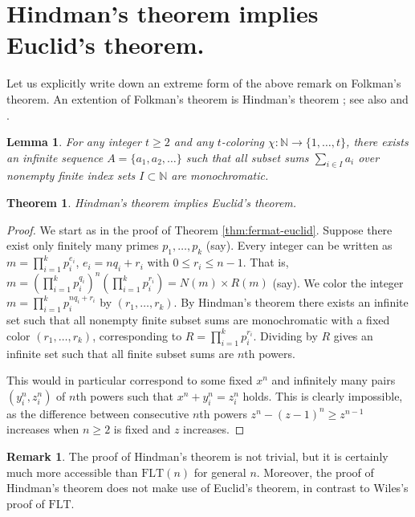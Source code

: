 \documentclass[12pt]{article}
\theoremstyle{theorem}
\newtheorem{theorem}{Theorem}
\newtheorem{lemma}{Lemma}
\theoremstyle{definition}
\newtheorem*{remark}{Remark}
\newcommand{\N}{\mathbb N}
\newcommand{\FLT}{\mathrm{FLT}}
\begin{document}
\section{Hindman's theorem implies Euclid's theorem.}
{\label{sec:Hindman}}
Let us explicitly write down an extreme form of the above remark on
Folkman's theorem.
An extention of Folkman's theorem is Hindman's theorem  
\cite{Hindman:1974}; see 
also \cite{Baumgartner:1974} and 
\cite[p. 85]{Graham-Rothschild-Spencer}. 
\begin{lemma}
For any integer $t\geq 2$ and any $t$-coloring 
$\chi:\N \rightarrow \{1, \ldots , t\}$, there exists an infinite sequence 
$A=\{a_1, a_2, \ldots \}$ such that all subset sums 
$\sum_{i \in I} a_i$ over nonempty 
finite index sets $I\subset \N$ are monochromatic.
\end{lemma}
\begin{theorem}{\label{thm:Hindman-implies-Euclid}}
Hindman's theorem implies Euclid's theorem.
\end{theorem}
\begin{proof}
We start as in the proof of Theorem {\ref{thm:fermat-euclid}}.
Suppose there exist only finitely many primes $p_1, \ldots, p_k$ (say).
Every integer
can be written as $m= \prod_{i=1}^k p_i^{e_i}$, 
$e_i=nq_i +r_i$ with \mbox{$0 \leq r_i \leq n-1$}. That is, 
$m= \left(\prod_{i=1}^k p_i^{q_i}\right)^n \left( \prod_{i=1}^k
  p_i^{r_i}\right) =N(m)\times R(m)$ (say).
We
color the integer $m= \prod_{i=1}^k p_i^{n q_i +r_i}$ by $(r_1, \ldots ,r_k)$. 
By Hindman's theorem there exists an infinite set such that
all nonempty finite subset sums are monochromatic with a fixed color
$(r_1, \ldots , r_k)$, corresponding to
$R=\prod_{i=1}^k p_i^{r_i}$.
 Dividing by $R$
gives an infinite set such that all finite subset sums
are $n$th powers.

This would
in particular correspond to some fixed $x^n$ and infinitely many 
pairs $(y_i^n,z_i^n)$ of $n$th powers such that $x^n+y_i^n=z_i^n$ holds.
This is clearly impossible, as the difference between
consecutive $n$th powers $z^n-(z-1)^n\geq z^{n-1}$ increases when $n\geq 2$ 
is fixed and $z$ increases. 
\end{proof}
\begin{remark}
The proof of Hindman's theorem is not trivial, but it is certainly much more
accessible than $\FLT(n)$ for general $n$. Moreover, the proof of Hindman's
theorem does not make use of Euclid's theorem, in contrast to Wiles's proof of
$\FLT$.


\end{remark}
\end{document}
